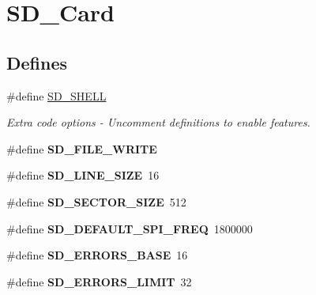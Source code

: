 \hypertarget{group__SD__Card}{\section{\-S\-D\-\_\-\-Card}
\label{group__SD__Card}
}
\subsection*{\-Defines}
\begin{DoxyCompactItemize}
\item 
\#define \hyperlink{group__SD__Card_ga453e7feb2ddf9256c6b5ab9399b12abc}{\-S\-D\-\_\-\-S\-H\-E\-L\-L}
\begin{DoxyCompactList}\small\item\em \-Extra code options -\/ \-Uncomment definitions to enable features. \end{DoxyCompactList}\item 
\hypertarget{group__SD__Card_gaf5d27aba1c39917482f4b3d40349e73e}{\#define {\bfseries \-S\-D\-\_\-\-F\-I\-L\-E\-\_\-\-W\-R\-I\-T\-E}}\label{group__SD__Card_gaf5d27aba1c39917482f4b3d40349e73e}

\item 
\hypertarget{group__SD__Card_gaf212493d1701d0e23dd8a98c2e963a7b}{\#define {\bfseries \-S\-D\-\_\-\-L\-I\-N\-E\-\_\-\-S\-I\-Z\-E}~16}\label{group__SD__Card_gaf212493d1701d0e23dd8a98c2e963a7b}

\item 
\hypertarget{group__SD__Card_ga35d62ba285152f13c64ba9e11fe69e7c}{\#define {\bfseries \-S\-D\-\_\-\-S\-E\-C\-T\-O\-R\-\_\-\-S\-I\-Z\-E}~512}\label{group__SD__Card_ga35d62ba285152f13c64ba9e11fe69e7c}

\item 
\hypertarget{group__SD__Card_ga13c71cd2e72c08f268a266c9c6e7c52d}{\#define {\bfseries \-S\-D\-\_\-\-D\-E\-F\-A\-U\-L\-T\-\_\-\-S\-P\-I\-\_\-\-F\-R\-E\-Q}~1800000}\label{group__SD__Card_ga13c71cd2e72c08f268a266c9c6e7c52d}

\item 
\hypertarget{group__SD__Card_ga3cd0c771442b35775f55f3982c2dc873}{\#define {\bfseries \-S\-D\-\_\-\-E\-R\-R\-O\-R\-S\-\_\-\-B\-A\-S\-E}~16}\label{group__SD__Card_ga3cd0c771442b35775f55f3982c2dc873}

\item 
\hypertarget{group__SD__Card_ga62e655fb68f48dbab77aec76faef26ae}{\#define {\bfseries \-S\-D\-\_\-\-E\-R\-R\-O\-R\-S\-\_\-\-L\-I\-M\-I\-T}~32}\label{group__SD__Card_ga62e655fb68f48dbab77aec76faef26ae}


\end{DoxyCompactItemize}
